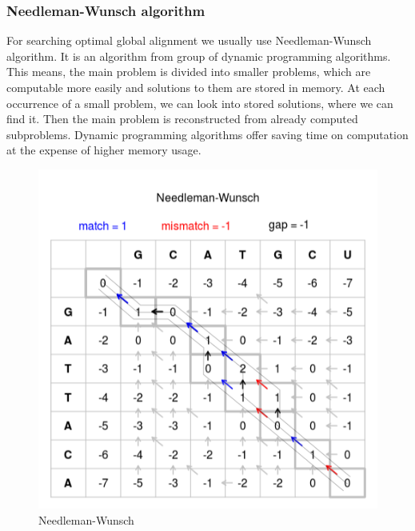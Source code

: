 
\subsubsection{Needleman-Wunsch algorithm}
For searching optimal global alignment we usually use Needleman-Wunsch algorithm.
It is an algorithm from group of dynamic programming algorithms.
This means, the main problem is divided into smaller problems, which are computable more easily and solutions to them are stored in memory.
At each occurrence of a small problem, we can look into stored solutions, where we can find it. 
Then the main problem is reconstructed from already computed subproblems.
Dynamic programming algorithms offer saving time on computation at the expense of higher memory usage.

\begin{figure}[ht]
 \centering
   \includegraphics[width=\textwidth]{./images/needle_wunsch.png}
 \caption{Needleman-Wunsch}
 \label{fig:glal}
\end{figure}

